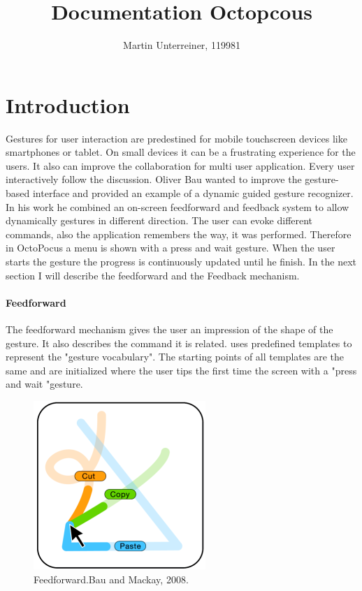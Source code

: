 \documentclass[11pt,twocolumn]{scrartcl}
\author{Martin Unterreiner, 119981}
\title{Documentation Octopcous}
\begin{document}
\noindent
\maketitle
\section{Introduction}
Gestures for user interaction are predestined for mobile touchscreen devices like smartphones or tablet. On small devices it can be a frustrating experience for the users. It also can improve the collaboration for multi user application. Every user interactively follow the discussion.  Oliver Bau wanted to improve the gesture-based interface and provided an example of a dynamic guided gesture recognizer. In his work he combined an on-screen feedforward and feedback system to allow dynamically gestures in different direction. The user can evoke different commands, also the application remembers the way, it was performed. Therefore in OctoPocus a menu is shown with a press and wait gesture. When the user starts the gesture the progress is continuously updated until he finish. In the next section I will describe the feedforward and the Feedback mechanism.
\paragraph{Feedforward}
The feedforward mechanism gives the user an impression of the shape of the gesture. It also describes the command it is related. \citeauthor{Bau2008} uses predefined templates to represent the "gesture vocabulary". The starting points of all templates are the same and are initialized where the user tips the first time the screen with a "press and wait "gesture. 
 \begin{figure}
 	 \begin{center}
 	\includegraphics[scale=0.4]{./img/feedforward.png}
 	\caption{Feedforward.Bau and Mackay, 2008.}
 	 \end{center}
 \end{figure}
\end{document}
